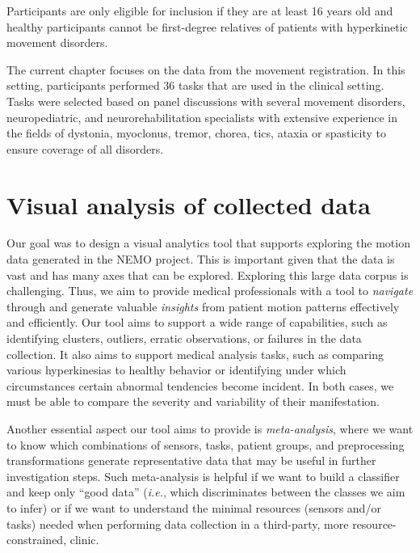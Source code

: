 Participants are only eligible for inclusion if they are at least 16 years old and healthy participants cannot be first-degree relatives of patients with hyperkinetic movement disorders. 

The current chapter focuses on the data from the movement registration. In this setting, participants performed 36 tasks that are used in the clinical setting. Tasks were selected based on panel discussions with several movement disorders, neuropediatric, and neurorehabilitation specialists with extensive experience in the fields of dystonia, myoclonus, tremor, chorea, tics, ataxia or spasticity to ensure coverage of all disorders.


\section{Visual analysis of collected data}
\label{sec:nemo_va}
%
Our goal was to design a visual analytics tool that supports exploring the motion data generated in the NEMO project. This is important given that the data is vast and has many axes that can be explored.
Exploring this large data corpus is challenging. Thus, we aim to provide medical professionals with a tool to \emph{navigate} through and generate valuable \emph{insights} from patient motion patterns effectively and efficiently. Our tool aims to support a wide range of capabilities, such as identifying clusters, outliers, erratic observations, or failures in the data collection. It also aims to support medical analysis tasks, such as comparing various hyperkinesias to healthy behavior or identifying under which circumstances certain abnormal tendencies become incident. In both cases, we must be able to compare the severity and variability of their manifestation.

Another essential aspect our tool aims to provide is \emph{meta-analysis}, where we want to know which combinations of sensors, tasks, patient groups, and preprocessing transformations generate representative data that may be useful in further investigation steps. Such meta-analysis is helpful if we want to build a classifier and keep only ``good data'' (\emph{i.e.}, which discriminates between the classes we aim to infer) or if we want to understand the minimal resources (sensors and/or tasks) needed when performing data collection in a third-party, more resource-constrained, clinic.

